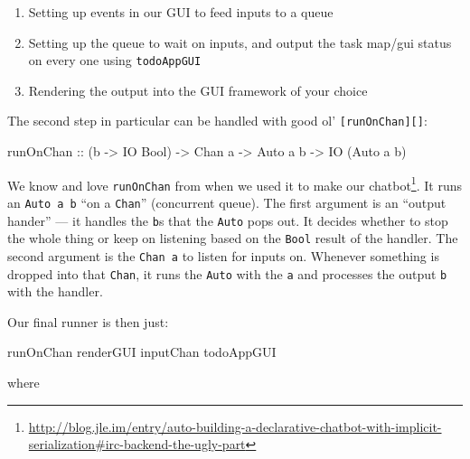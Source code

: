 \documentclass[]{article}
\newenvironment{Shaded}{}{}
\newcommand{\DataTypeTok}[1]{\textcolor[rgb]{0.56,0.13,0.00}{#1}}
\newcommand{\NormalTok}[1]{#1}
\newcommand{\OtherTok}[1]{\textcolor[rgb]{0.00,0.44,0.13}{#1}}
\renewcommand{\href}[2]{#2\footnote{\url{#1}}}
\begin{document}
\begin{enumerate}
\def\labelenumi{\arabic{enumi}.}
\tightlist
\item
  Setting up events in our GUI to feed inputs to a queue
\item
  Setting up the queue to wait on inputs, and output the task map/gui status on
  every one using \texttt{todoAppGUI}
\item
  Rendering the output into the GUI framework of your choice
\end{enumerate}

The second step in particular can be handled with good ol'
\texttt{{[}runOnChan{]}{[}{]}}:

\begin{Shaded}
\begin{Highlighting}[]
\OtherTok{runOnChan ::}\NormalTok{ (b }\OtherTok{{-}\textgreater{}} \DataTypeTok{IO} \DataTypeTok{Bool}\NormalTok{) }\OtherTok{{-}\textgreater{}} \DataTypeTok{Chan}\NormalTok{ a }\OtherTok{{-}\textgreater{}} \DataTypeTok{Auto\textquotesingle{}}\NormalTok{ a b }\OtherTok{{-}\textgreater{}} \DataTypeTok{IO}\NormalTok{ (}\DataTypeTok{Auto\textquotesingle{}}\NormalTok{ a b)}
\end{Highlighting}
\end{Shaded}

We know and love \texttt{runOnChan} from when we used it to make our
\href{http://blog.jle.im/entry/auto-building-a-declarative-chatbot-with-implicit-serialization\#irc-backend-the-ugly-part}{chatbot}.
It runs an \texttt{Auto\textquotesingle{}\ a\ b} ``on a \texttt{Chan}''
(concurrent queue). The first argument is an ``output hander'' --- it handles
the \texttt{b}s that the \texttt{Auto\textquotesingle{}} pops out. It decides
whether to stop the whole thing or keep on listening based on the \texttt{Bool}
result of the handler. The second argument is the \texttt{Chan\ a} to listen for
inputs on. Whenever something is dropped into that \texttt{Chan}, it runs the
\texttt{Auto\textquotesingle{}} with the \texttt{a} and processes the output
\texttt{b} with the handler.

Our final runner is then just:

\begin{Shaded}
\begin{Highlighting}[]
\NormalTok{runOnChan renderGUI inputChan todoAppGUI}
\end{Highlighting}
\end{Shaded}

where
\end{document}
